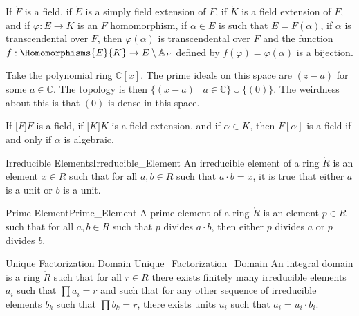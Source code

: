     \begin{theorem}
        If $\ring{F}$ is a field, if $\ring{E}$ is a simply field extension
        of $F$, if $\ring{K}$ is a field extension of $F$, and if
        $\varphi:E\rightarrow{K}$ is an $F$ homomorphism, if $\alpha\in{E}$
        is such that $E=F(\alpha)$, if $\alpha$ is transcendental over $F$,
        then $\varphi(\alpha)$ is transcendental over $F$ and the function
        $f:\Homomorphisms{E}{K}\rightarrow{E}\setminus\mathbb{A}_{F}$
        defined by $f(\varphi)=\varphi(\alpha)$ is a bijection.
    \end{theorem}
    \begin{example}
        Take the polynomial ring $\mathbb{C}[x]$. The prime ideals on this
        space are $(z-a)$ for some $a\in\mathbb{C}$. The topology is then
        $\{(x-a)\;|\;a\in\mathbb{C}\}\cup\{(0)\}$. The weirdness about this
        is that $(0)$ is dense in this space.
    \end{example}
    \begin{theorem}
        If $\ring[F]{F}$ is a field, if $\ring[K]{K}$ is a field extension,
        and if $\alpha\in{K}$, then $F[\alpha]$ is a field if and only if
        $\alpha$ is algebraic. 
    \end{theorem}
    \begin{theorem}
    \end{theorem}
    \begin{fdefinition}{Irreducible Elements}{Irreducible_Element}
        An irreducible element of a ring $\ring{R}$ is an element
        $x\in{R}$ such that for all $a,b\in{R}$ such that $a\cdot{b}=x$, it
        is true that either $a$ is a unit or $b$ is a unit.
    \end{fdefinition}
    \begin{fdefinition}{Prime Element}{Prime_Element}
        A prime element of a ring $\ring{R}$ is an element $p\in{R}$
        such that for all $a,b\in{R}$ such that $p$ divides $a\cdot{b}$,
        then either $p$ divides $a$ or $p$ divides $b$.
    \end{fdefinition}
    \begin{fdefinition}{Unique Factorization Domain}
                       {Unique_Factorization_Domain}
        An integral domain is a ring $\ring{R}$ such that for all $r\in{R}$
        there exists finitely many irreducible elements $a_{i}$ such that
        $\prod{a}_{i}=r$ and such that for any other sequence of irreducible
        elements $b_{k}$ such that $\prod{b}_{k}=r$, there exists units
        $u_{i}$ such that $a_{i}=u_{i}\cdot{b}_{i}$.
    \end{fdefinition}
